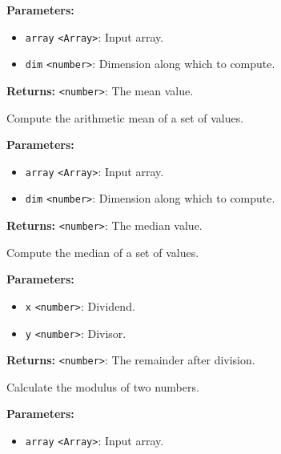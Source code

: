\documentclass[12pt,a4paper]{article}
\begin{document}
\noindent \textbf{Parameters:}
\begin{itemize}
  \item \texttt{array} \texttt{<Array>}: Input array.
  \item \texttt{dim} \texttt{<number>}: Dimension along which to compute.
\end{itemize}

\noindent \textbf{Returns:} \texttt{<number>}: The mean value.

\noindent Compute the arithmetic mean of a set of values.

\vspace{5mm}
\noindent {}


\noindent \textbf{Parameters:}
\begin{itemize}
  \item \texttt{array} \texttt{<Array>}: Input array.
  \item \texttt{dim} \texttt{<number>}: Dimension along which to compute.
\end{itemize}

\noindent \textbf{Returns:} \texttt{<number>}: The median value.

\noindent Compute the median of a set of values.

\vspace{5mm}
\noindent {}


\noindent \textbf{Parameters:}
\begin{itemize}
  \item \texttt{x} \texttt{<number>}: Dividend.
  \item \texttt{y} \texttt{<number>}: Divisor.
\end{itemize}

\noindent \textbf{Returns:} \texttt{<number>}: The remainder after division.

\noindent Calculate the modulus of two numbers.

\vspace{5mm}
\noindent {}


\noindent \textbf{Parameters:}
\begin{itemize}
  \item \texttt{array} \texttt{<Array>}: Input array.
\end{itemize}
\end{document}
